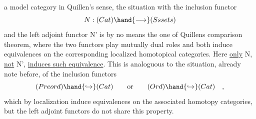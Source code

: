 a model category in Quillen's sense,  the situation with the inclusion
functor
\[ N:(Cat)\hand{\longrightarrow} (Ss sets) \]
and the left adjoint functor N'  is by no means the one of Quillens
comparison theorem,  where the two functors play mutually dual roles
and both induce equivalences on the corresponding localized homotopical
categories.  Here \uline{only} N,  \uline{not} N',  \uline{induces such equivalence}.  This is
analoguous to the situation,  already note before,  of the inclusion
functors
\[ (Preord)\hand{\hookrightarrow} (Cat) \qquad\text{or}\qquad (Ord)\hand{\hookrightarrow} (Cat) \quad , \]
which \inserted{[presumably]} by localization induce equivalences on the associated homotopy
categories,  but the left adjoint functors do not share this property.


